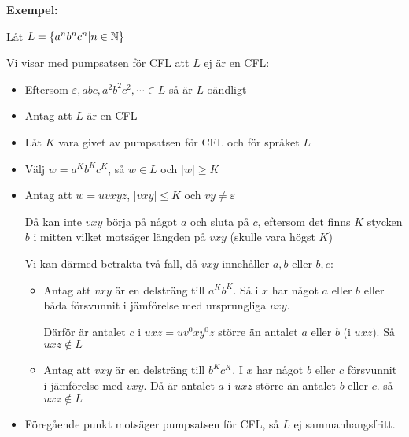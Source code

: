 \par\bigskip
\noindent\textbf{Exempel:}\par
\noindent Låt $L = \left\{a^nb^nc^n|n\in\mathbb{N}\right\}$\par
\noindent Vi visar med pumpsatsen för CFL att $L$ ej är en CFL:\par
\begin{itemize}
  \item Eftersom $\varepsilon, abc,a^2b^2c^2,\cdots\in L$ så är $L$ oändligt
  \item Antag att $L$ är en CFL
  \item Låt $K$ vara givet av pumpsatsen för CFL och för språket $L$
  \item Välj $w=a^Kb^Kc^K$, så $w\in L$ och $\left|w\right|\geq K$
  \item Antag att $w = uvxyz$, $\left|vxy\right|\leq K$ och $vy\neq\varepsilon$\par
    \noindent Då kan inte $vxy$ börja på något $a$ och sluta på $c$, eftersom det finns $K$ stycken $b$ i mitten vilket motsäger längden på $vxy$ (skulle vara högst $K$)\par
    \noindent Vi kan därmed betrakta två fall, då $vxy$ innehåller $a,b$ eller $b,c$:
    \begin{itemize}
      \item Antag att $vxy$ är en delsträng till $a^Kb^K$. Så i $x$ har något $a$ eller $b$ eller båda försvunnit i jämförelse med ursprungliga $vxy$.\par
        \noindent Därför är antalet $c$ i $uxz = uv^0xy^0z$ större än antalet $a$ eller $b$ (i $uxz$). Så $uxz\notin L$
        \par\bigskip
      \item Antag att $vxy$ är en delsträng till $b^Kc^K$. I $x$ har något $b$ eller $c$ försvunnit i jämförelse med $vxy$. Då är antalet $a$ i $uxz$ större än antalet $b$ eller $c$. så $uxz\notin L$
    \end{itemize}
  \item Föregående punkt motsäger pumpsatsen för CFL, så $L$ ej sammanhangsfritt.
\end{itemize}
\newpage
